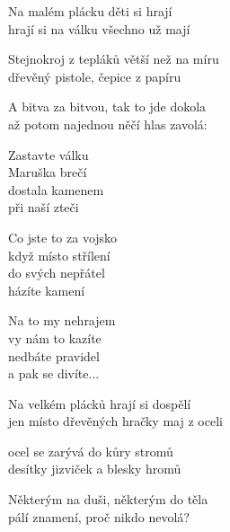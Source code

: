 
\ve{}
Na malém plácku děti si hrají\\
hrají si na válku všechno už mají

Stejnokroj z tepláků větší než na míru\\
dřevěný pistole, čepice z papíru

A bitva za bitvou, tak to jde dokola\\
až potom najednou něčí hlas zavolá:

\cho{}
Zastavte válku\\
Maruška brečí\\
dostala kamenem\\
při naší zteči

Co jste to za vojsko\\
když místo střílení\\
do svých nepřátel\\
házíte kamení

Na to my nehrajem\\
vy nám to kazíte\\
nedbáte pravidel\\
a pak se divíte...

\ve{}
Na velkém plácků hrají si dospělí\\
jen místo dřevěných hračky maj z oceli

ocel se zarývá do kůry stromů\\
desítky jizviček a blesky hromů

Některým na duši, některým do těla\\
pálí znamení, proč nikdo nevolá?

\cho{}

\esong